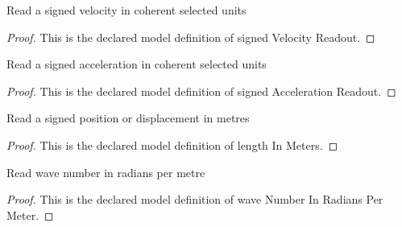 \begin{definition}
  \label{def:physics:phyx-mini-0288:phyxminiproblems-problemphyxmini0288-signedvelocityreadout}
  Read a signed velocity in coherent selected units
\end{definition}
\begin{proof}
  This is the declared model definition of signed Velocity Readout.
\end{proof}
\begin{definition}
  \label{def:physics:phyx-mini-0288:phyxminiproblems-problemphyxmini0288-signedaccelerationreadout}
  Read a signed acceleration in coherent selected units
\end{definition}
\begin{proof}
  This is the declared model definition of signed Acceleration Readout.
\end{proof}
\begin{definition}
  \label{def:physics:phyx-mini-0288:phyxminiproblems-problemphyxmini0288-lengthinmeters}
  Read a signed position or displacement in metres
\end{definition}
\begin{proof}
  This is the declared model definition of length In Meters.
\end{proof}
\begin{definition}
  \label{def:physics:phyx-mini-0288:phyxminiproblems-problemphyxmini0288-wavenumberinradianspermeter}
  Read wave number in radians per metre
\end{definition}
\begin{proof}
  This is the declared model definition of wave Number In Radians Per Meter.
\end{proof}

